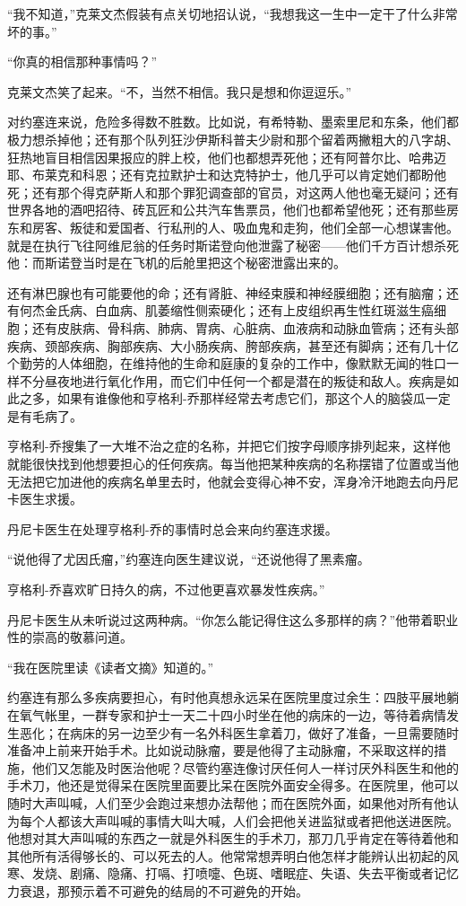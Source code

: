     “我不知道，”克莱文杰假装有点关切地招认说，“我想我这一生中一定干了什么非常坏的事。”

    “你真的相信那种事情吗？”

    克莱文杰笑了起来。“不，当然不相信。我只是想和你逗逗乐。”

    对约塞连来说，危险多得数不胜数。比如说，有希特勒、墨索里尼和东条，他们都极力想杀掉他；还有那个队列狂沙伊斯科普夫少尉和那个留着两撇粗大的八字胡、狂热地盲目相信因果报应的胖上校，他们也都想弄死他；还有阿普尔比、哈弗迈耶、布莱克和科恩；还有克拉默护士和达克特护士，他几乎可以肯定她们都盼他死；还有那个得克萨斯人和那个罪犯调查部的官员，对这两人他也毫无疑问；还有世界各地的酒吧招待、砖瓦匠和公共汽车售票员，他们也都希望他死；还有那些房东和房客、叛徒和爱国者、行私刑的人、吸血鬼和走狗，他们全部一心想谋害他。就是在执行飞往阿维尼翁的任务时斯诺登向他泄露了秘密——他们千方百计想杀死他：而斯诺登当时是在飞机的后舱里把这个秘密泄露出来的。

    还有淋巴腺也有可能要他的命；还有肾脏、神经束膜和神经膜细胞；还有脑瘤；还有何杰金氏病、白血病、肌萎缩性侧索硬化；还有上皮组织再生性红斑滋生癌细胞；还有皮肤病、骨科病、肺病、胃病、心脏病、血液病和动脉血管病；还有头部疾病、颈部疾病、胸部疾病、大小肠疾病、胯部疾病，甚至还有脚病；还有几十亿个勤劳的人体细胞，在维持他的生命和庭康的复杂的工作中，像默默无闻的牲口一样不分昼夜地进行氧化作用，而它们中任何一个都是潜在的叛徒和敌人。疾病是如此之多，如果有谁像他和亨格利-乔那样经常去考虑它们，那这个人的脑袋瓜一定是有毛病了。
 


    亨格利-乔搜集了一大堆不治之症的名称，并把它们按字母顺序排列起来，这样他就能很快找到他想要担心的任何疾病。每当他把某种疾病的名称摆错了位置或当他无法把它加进他的疾病名单里去时，他就会变得心神不安，浑身冷汗地跑去向丹尼卡医生求援。

    丹尼卡医生在处理亨格利-乔的事情时总会来向约塞连求援。

    “说他得了尤因氏瘤，”约塞连向医生建议说，“还说他得了黑素瘤。

    亨格利-乔喜欢旷日持久的病，不过他更喜欢暴发性疾病。”

    丹尼卡医生从未听说过这两种病。“你怎么能记得住这么多那样的病？”他带着职业性的崇高的敬慕问道。

    “我在医院里读《读者文摘》知道的。”

    约塞连有那么多疾病要担心，有时他真想永远呆在医院里度过余生：四肢平展地躺在氧气帐里，一群专家和护士一天二十四小时坐在他的病床的一边，等待着病情发生恶化；在病床的另一边至少有一名外科医生拿着刀，做好了准备，一旦需要随时准备冲上前来开始手术。比如说动脉瘤，要是他得了主动脉瘤，不采取这样的措施，他们又怎能及时医治他呢？尽管约塞连像讨厌任何人一样讨厌外科医生和他的手术刀，他还是觉得呆在医院里面要比呆在医院外面安全得多。在医院里，他可以随时大声叫喊，人们至少会跑过来想办法帮他；而在医院外面，如果他对所有他认为每个人都该大声叫喊的事情大叫大喊，人们会把他关进监狱或者把他送进医院。他想对其大声叫喊的东西之一就是外科医生的手术刀，那刀几乎肯定在等待着他和其他所有活得够长的、可以死去的人。他常常想弄明白他怎样才能辨认出初起的风寒、发烧、剧痛、隐痛、打嗝、打喷嚏、色斑、嗜眠症、失语、失去平衡或者记忆力衰退，那预示着不可避免的结局的不可避免的开始。

